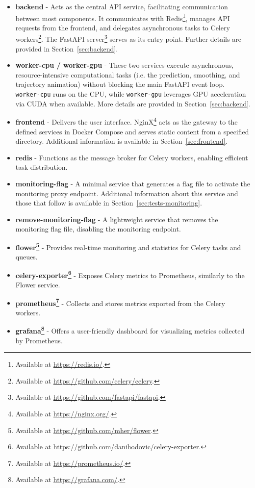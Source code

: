 \begin{itemize}
    \item \textbf{backend} - Acts as the central API service, facilitating communication between most components. It communicates with Redis\footnote{Available at \url{https://redis.io/}.}, manages API requests from the frontend, and delegates asynchronous tasks to Celery workers\footnote{Available at \url{https://github.com/celery/celery}.}. The FastAPI server\footnote{Available at \url{https://github.com/fastapi/fastapi}.} serves as its entry point. Further details are provided in Section~\ref{sec:backend}.
    \item \textbf{worker-cpu / worker-gpu} - These two services execute asynchronous, resource-intensive computational tasks (i.e. the prediction, smoothing, and trajectory animation) without blocking the main FastAPI event loop. \texttt{worker-cpu} runs on the CPU, while \texttt{worker-gpu} leverages GPU acceleration via CUDA when available. More details are provided in Section~\ref{sec:backend}.
    \item \textbf{frontend} - Delivers the user interface. NginX\footnote{Available at \url{https://nginx.org/}.} acts as the gateway to the defined services in Docker Compose and serves static content from a specified directory. Additional information is available in Section~\ref{sec:frontend}.
    \item \textbf{redis} - Functions as the message broker for Celery workers, enabling efficient task distribution.
    \item \textbf{monitoring-flag} - A minimal service that generates a flag file to activate the monitoring proxy endpoint. Additional information about this service and those that follow is available in Section~\ref{sec:tests-monitoring}.
    \item \textbf{remove-monitoring-flag} - A lightweight service that removes the monitoring flag file, disabling the monitoring endpoint.
    \item \textbf{flower\footnote{Available at \url{https://github.com/mher/flower}.}} - Provides real-time monitoring and statistics for Celery tasks and queues.
    \item \textbf{celery-exporter\footnote{Available at \url{https://github.com/danihodovic/celery-exporter}.}} - Exposes Celery metrics to Prometheus, similarly to the Flower service.
    \item \textbf{prometheus\footnote{Available at \url{https://prometheus.io/}.}} - Collects and stores metrics exported from the Celery workers.
    \item \textbf{grafana\footnote{Available at \url{https://grafana.com/}.}} - Offers a user-friendly dashboard for visualizing metrics collected by Prometheus.
\end{itemize}

